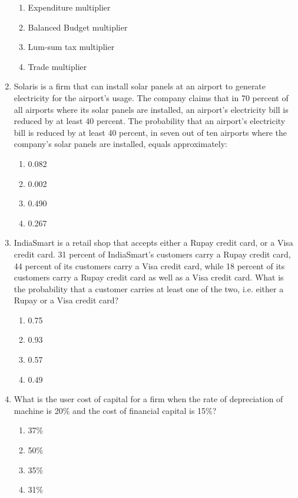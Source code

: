 \documentclass[journal,12pt,onecolumn]{exam}
\theoremstyle{remark}
\begin{document}
\begin{enumerate}
  \begin{enumerate}
    \item Expenditure multiplier
    \item Balanced Budget multiplier
    \item Lum-sum tax multiplier
    \item Trade multiplier
  \end{enumerate}
  \newpage
\item Solaris is a firm that can install solar panels at an airport to generate electricity for the airport's usage. The company claims that in 70 percent of all airports where its solar panels are installed, an airport's electricity bill is reduced by at least 40 percent. The probability that an airport's electricity bill is reduced by at least 40 percent, in seven out of ten airports where the company's solar panels are installed, equals approximately:

  \begin{enumerate}
    \item 0.082
    \item 0.002
    \item 0.490
    \item 0.267
  \end{enumerate}

  \item IndiaSmart is a retail shop that accepts either a Rupay credit card, or a Visa credit card. 31 percent of IndiaSmart's customers carry a Rupay credit card, 44 percent of its customers carry a Visa credit card, while 18 percent of its customers carry a Rupay credit card as well as a Visa credit card. What is the probability that a customer carries at least one of the two, i.e. either a Rupay or a Visa credit card?

  \begin{enumerate}
    \item 0.75
    \item 0.93
    \item 0.57
    \item 0.49
  \end{enumerate}

   \item What is the user cost of capital for a firm when the rate of depreciation of machine is 20\% and the cost of financial capital is 15\%?

  \begin{enumerate}
    \item 37\%
    \item 50\%
    \item 35\%
    \item 31\%
  \end{enumerate}


\end{enumerate}
\end{document}
